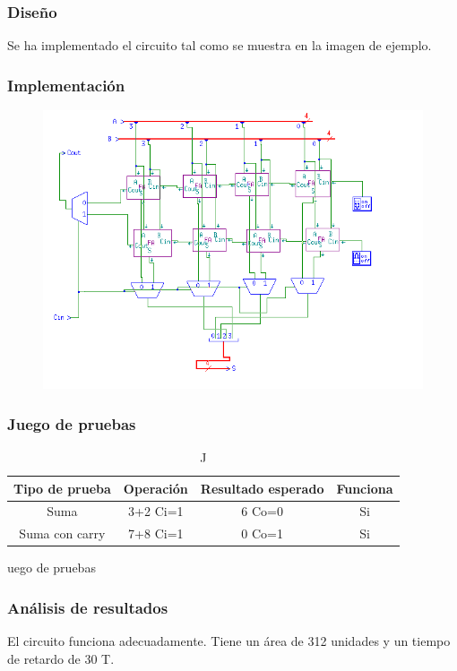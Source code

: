 \documentclass{article}
\begin{document}
		\subsubsection*{Diseño}
		Se ha implementado el circuito tal como se muestra en la imagen de ejemplo.


		\subsubsection*{Implementación}
		 \begin{figure}[ht]
		 	\includegraphics[width=0.8\linewidth]{CSA}
		 	\centering
		 \end{figure}


		\subsubsection*{Juego de pruebas}
		\begin{table}[h]
			\begin{center}
				\begin{tabular}{| c | c | c | c |}
					\hline
					Tipo de prueba & Operación & Resultado esperado & Funciona \\ \hline
				
					Suma & 3+2 Ci=1 & 6 Co=0 & Si \\ \hline
					Suma con carry & 7+8 Ci=1 & 0 Co=1 & Si \\ \hline
			
				\end{tabular}
				\caption Juego de pruebas
			\end{center}
		\end{table}



		\subsubsection*{Análisis de resultados}
		El circuito funciona adecuadamente. Tiene un área de 312 unidades y un tiempo de retardo de 30 T.
\end{document}
